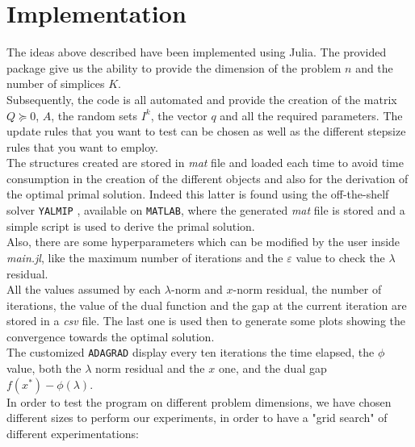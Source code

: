 \documentclass[notitlepage]{article}
\begin{document}
\section{Implementation}
The ideas above described have been implemented using Julia. The provided package give us the ability to provide the dimension of the problem $n$ and the number of simplices $K$.\\
Subsequently, the code is all automated and provide the creation of the matrix $Q \succeq 0$, $A$, the random sets $I^k$, the vector $q$ and all the required parameters. The update rules that you want 
to test can be chosen as well as the different stepsize rules that you want to employ.\\
The structures created are stored in \textit{mat} file and loaded each time to avoid time consumption in the creation of the different objects and also for the derivation of the optimal primal solution. 
Indeed this latter is found using the off-the-shelf solver \texttt{YALMIP} \cite{Lofberg2004}, available on \texttt{MATLAB}, where the generated \textit{mat} file is stored and a simple script is used to derive the primal solution.\\
Also, there are some hyperparameters which can be modified by the user inside \textit{main.jl}, like the maximum number of iterations and the $\varepsilon$ value to check the $\lambda$ residual.\\
All the values assumed by each $\lambda$-norm and $x$-norm residual, the number of iterations, the value of the dual function and the gap at the current iteration are stored in a \textit{csv} file. 
The last one is used then to generate some plots showing the convergence towards the optimal solution.\\
The customized \texttt{ADAGRAD} display every ten iterations the time elapsed, the $\phi$ value, both the $\lambda$ norm residual and the $x$ one, and the dual gap $f(x^*) - \phi(\lambda)$.\\
In order to test the program on different problem dimensions, we have chosen different sizes to perform our experiments, in order to have a "grid search" of different experimentations:

\begin{center}
\end{center}
\end{document}
